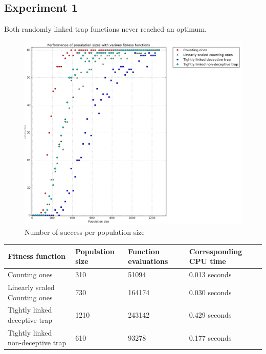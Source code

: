 \documentclass[12pt]{article}
\theoremstyle{definition}
\begin{document}
\subsection*{Experiment 1}
\label{exp1}
Both randomly linked trap functions never reached an optimum.

\begin{figure}[H]
    \centering
    \includegraphics[totalheight=0.7\textheight]{images/exp1.png}
    \caption{Number of success per population size}
\label{fig:exp1}
\end{figure}

\begin{adjustwidth}{0cm}{}
\begin{minipage}{\linewidth}
\centering
\label{tab:title}
\begin{tabular}{lp{2.5cm}p{2.5cm}p{2.8cm}}
\toprule[1.5pt]
\bf Fitness function & \bf Population size & \bf Function evaluations & \bf Corresponding CPU time\\\midrule
Counting ones & 310 & 51094 & 0.013 seconds \\
Linearly scaled Counting ones & 730 & 164174 & 0.030 seconds \\
Tightly linked deceptive trap & 1210 & 243142 & 0.429 seconds \\
Tightly linked non-deceptive trap & 610 & 93278 & 0.177 seconds \\
\bottomrule[1.25pt]
\end{tabular}\par
\bigskip
{}
\end{minipage}
\end{adjustwidth}
\end{document}
